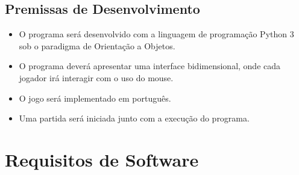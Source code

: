 \documentclass{article}
\begin{document}
\subsection{Premissas de Desenvolvimento}
    \begin{itemize}
        \item O programa será desenvolvido com a linguagem de programação Python 3 sob o paradigma de Orientação a Objetos.
        
        \item O programa deverá apresentar uma interface bidimensional, onde cada jogador irá interagir com o uso do mouse.
        
        \item O jogo será implementado em português.
        
        \item Uma partida será iniciada junto com a execução do programa.
        
    \end{itemize}
    
\section{Requisitos de Software}
\end{document}

